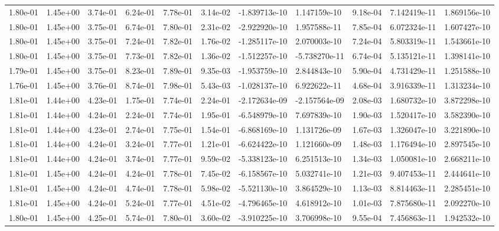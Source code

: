 \begin{longtable}{| p{} | p{} |}
1.80e-01 & 1.45e+00 & 3.74e-01 & 6.24e-01 & 7.78e-01 & 3.14e-02 & -1.839713e-10 &  1.147159e-10 &  9.18e-04 &  7.142419e-11 &  1.869156e-10 \\
1.80e-01 & 1.45e+00 & 3.75e-01 & 6.74e-01 & 7.80e-01 & 2.31e-02 & -2.922920e-10 &  1.957588e-11 &  7.85e-04 &  6.072324e-11 &  1.607427e-10 \\
1.80e-01 & 1.45e+00 & 3.75e-01 & 7.24e-01 & 7.82e-01 & 1.76e-02 & -1.285117e-10 &  2.070003e-10 &  7.24e-04 &  5.803319e-11 &  1.543661e-10 \\
1.80e-01 & 1.45e+00 & 3.75e-01 & 7.73e-01 & 7.82e-01 & 1.36e-02 & -1.512257e-10 & -5.738270e-11 &  6.74e-04 &  5.135121e-11 &  1.398141e-10 \\
1.79e-01 & 1.45e+00 & 3.75e-01 & 8.23e-01 & 7.89e-01 & 9.35e-03 & -1.953759e-10 &  2.844843e-10 &  5.90e-04 &  4.731429e-11 &  1.251588e-10 \\
1.76e-01 & 1.45e+00 & 3.76e-01 & 8.74e-01 & 7.98e-01 & 5.43e-03 & -1.028137e-10 &  6.922622e-11 &  4.68e-04 &  3.916339e-11 &  1.313234e-10 \\
1.81e-01 & 1.44e+00 & 4.23e-01 & 1.75e-01 & 7.74e-01 & 2.24e-01 & -2.172634e-09 & -2.157564e-09 &  2.08e-03 &  1.680732e-10 &  3.872298e-10 \\
1.81e-01 & 1.44e+00 & 4.24e-01 & 2.24e-01 & 7.74e-01 & 1.95e-01 & -6.548979e-10 &  7.697839e-10 &  1.90e-03 &  1.520417e-10 &  3.582390e-10 \\
1.81e-01 & 1.44e+00 & 4.23e-01 & 2.74e-01 & 7.75e-01 & 1.54e-01 & -6.868169e-10 &  1.131726e-09 &  1.67e-03 &  1.326047e-10 &  3.221890e-10 \\
1.81e-01 & 1.44e+00 & 4.24e-01 & 3.24e-01 & 7.77e-01 & 1.21e-01 & -6.624422e-10 &  1.121660e-09 &  1.48e-03 &  1.176494e-10 &  2.897545e-10 \\
1.81e-01 & 1.44e+00 & 4.24e-01 & 3.74e-01 & 7.77e-01 & 9.59e-02 & -5.338123e-10 &  6.251513e-10 &  1.34e-03 &  1.050081e-10 &  2.668211e-10 \\
1.81e-01 & 1.45e+00 & 4.24e-01 & 4.24e-01 & 7.78e-01 & 7.45e-02 & -6.158567e-10 &  5.032741e-10 &  1.21e-03 &  9.407453e-11 &  2.444641e-10 \\
1.81e-01 & 1.45e+00 & 4.24e-01 & 4.74e-01 & 7.78e-01 & 5.98e-02 & -5.521130e-10 &  3.864529e-10 &  1.13e-03 &  8.814463e-11 &  2.285451e-10 \\
1.81e-01 & 1.45e+00 & 4.24e-01 & 5.24e-01 & 7.77e-01 & 4.51e-02 & -4.796465e-10 &  4.618912e-10 &  1.01e-03 &  7.875680e-11 &  2.092270e-10 \\
1.80e-01 & 1.45e+00 & 4.25e-01 & 5.74e-01 & 7.80e-01 & 3.60e-02 & -3.910225e-10 &  3.706998e-10 &  9.55e-04 &  7.456863e-11 &  1.942532e-10 \\

\end{longtable}
